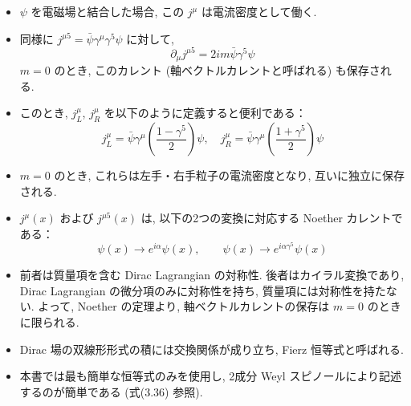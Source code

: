 \documentclass[a4paper,12pt]{article}
\begin{document}
\begin{itemize}
  \item $\psi$ を電磁場と結合した場合, この $j^\mu$ は電流密度として働く.

  \item 同様に $j^{\mu5} = \bar{\psi} \gamma^\mu \gamma^5 \psi$ に対して,
  \begin{equation*}
    \partial_\mu j^{\mu5} = 2im \bar{\psi} \gamma^5 \psi \tag{3.75}
  \end{equation*}
  $m = 0$ のとき, このカレント (軸ベクトルカレントと呼ばれる) も保存される.

  \item このとき, $j^\mu_L$, $j^\mu_R$ を以下のように定義すると便利である：
  \begin{equation*}
    j^\mu_L = \bar{\psi} \gamma^\mu \left( \frac{1 - \gamma^5}{2} \right) \psi, \quad
    j^\mu_R = \bar{\psi} \gamma^\mu \left( \frac{1 + \gamma^5}{2} \right) \psi \tag{3.76}
  \end{equation*}

  \item $m = 0$ のとき, これらは左手・右手粒子の電流密度となり, 互いに独立に保存される.

  \item $j^\mu(x)$ および $j^{\mu5}(x)$ は, 以下の2つの変換に対応する Noether カレントである：
  \begin{equation*}
    \psi(x) \rightarrow e^{i\alpha} \psi(x), \qquad
    \psi(x) \rightarrow e^{i\alpha \gamma^5} \psi(x)
  \end{equation*}

  \item 前者は質量項を含む Dirac Lagrangian の対称性. 後者はカイラル変換であり, Dirac Lagrangian の微分項のみに対称性を持ち, 質量項には対称性を持たない. よって, Noether の定理より, 軸ベクトルカレントの保存は $m = 0$ のときに限られる.

  \item Dirac 場の双線形形式の積には交換関係が成り立ち, Fierz 恒等式と呼ばれる.

  \item 本書では最も簡単な恒等式のみを使用し, 2成分 Weyl スピノールにより記述するのが簡単である (式(3.36) 参照).


\end{itemize}
\end{document}
